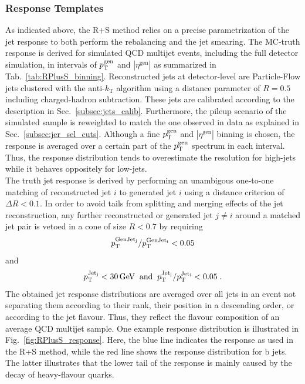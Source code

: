  \subsubsection*{Response Templates}
\label{subsubsec:qcd_response}
As indicated above, the R+S method relies on a precise parametrization of the jet response to both perform the rebalancing and the jet smearing. The MC-truth response is derived for simulated QCD multijet events, including the full detector simulation, in intervals of $p_{\text{T}}^\mathrm{gen}$ and $|\eta^\mathrm{gen}|$ as summarized in Tab.~\ref{tab:RPlusS_binning}. Reconstructed jets at detector-level are Particle-Flow jets clustered with the anti-$k_\mathrm{T}$ algorithm using a distance parameter of $R = 0.5$ including charged-hadron subtraction. These jets are calibrated according to the description in Sec.~\ref{subsec:jets_calib}. Furthermore, the pileup scenario of the simulated sample is reweighted to match the one observed in data as explained in Sec.~\ref{subsec:jer_sel_cuts}. Although a fine $p_{\text{T}}^\mathrm{gen}$ and $|\eta^\mathrm{gen}|$ binning is chosen, the response is averaged over a certain part of the $p_{\text{T}}^\mathrm{gen}$ spectrum in each interval. Thus, the response distribution tends to overestimate the resolution for high-\pt jets while it behaves oppositely for low-\pt jets. \\
The truth jet response is derived by performing an unambigous one-to-one matching of reconstructed jet $i$ to generated jet $i$ using a distance criterion of $\Delta R < 0.1$. In order to avoid tails from splitting and merging effects of the jet reconstruction, any further reconstructed or generated jet $j \ne i$ around a matched jet pair is vetoed in a cone of size $R < 0.7$ by requiring
\begin{equation}
 p_{\text{T}}^{\rm{GenJet}_j} / p_{\text{T}}^{\rm{GenJet}_i} < 0.05
\end{equation} 
and
\begin{equation}
 p_{\text{T}}^{\rm{Jet}_j} < 30\,\mathrm{GeV} \;\; \mathrm{and} \;\; p_{\text{T}}^{\rm{Jet}_j} / p_{\text{T}}^{\rm{Jet}_i} < 0.05 \; .
\end{equation} 
The obtained jet response distributions are averaged over all jets in an event not separating them according to their rank, \ie their position in a descending \pt order, or according to the jet flavour. Thus, they reflect the flavour composition of an average QCD multijet sample. One example response distribution is illustrated in Fig.~\ref{fig:RPlusS_response}. Here, the blue line indicates the response as used in the R+S method, while the red line shows the response distribution for b jets. The latter illustrates that the lower tail of the response is mainly caused by the decay of heavy-flavour quarks.
